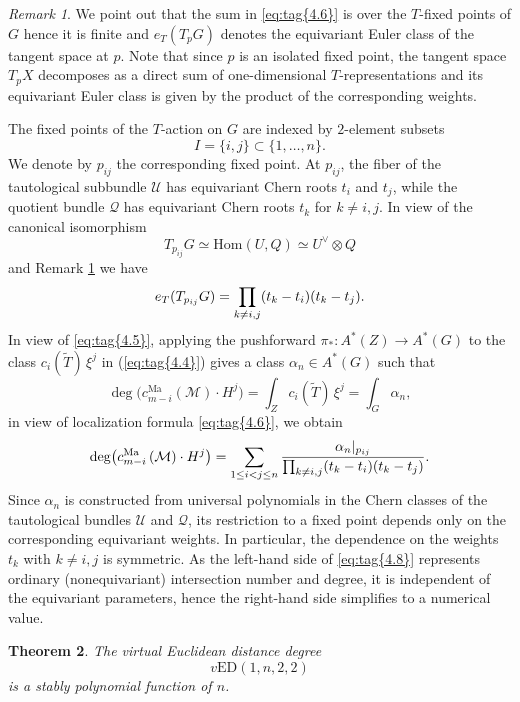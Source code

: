 \documentclass[11pt]{article}
\numberwithin{equation}{section}
\numberwithin{figure}{section}
\theoremstyle{plain}
\newtheorem{thm}{Theorem}[section]
\theoremstyle{definition}
\theoremstyle{remark}
\newtheorem{rem}[thm]{Remark}
\newcommand{\Hom}{\mathrm{Hom}}
\newcommand{\vED}{v\mathrm{ED}}
\begin{document}
\begin{rem}\label{rem:identificationEulerClassTangent}
    We point out that the sum in \ref{eq:tag{4.6}} is over the $T$-fixed points of $G$ hence it is finite and $e_T(T_pG)$ denotes the equivariant Euler class of the tangent space at $p$. Note that since $p$ is an isolated fixed point, the tangent space $T_p X$ decomposes as a direct sum of one-dimensional $T$-representations and its equivariant Euler class is given by the product of the corresponding weights.
\end{rem}
The fixed points of the $T$-action on $G$ are indexed by
$2$-element subsets $$I=\{i,j\}\subset\{1,\dots,n\}.$$
We denote by $p_{ij}$ the corresponding fixed point.
At $p_{ij}$, the fiber of the tautological subbundle $\mathcal U$ has
equivariant Chern roots $t_i$ and $t_j$, while the quotient bundle
$\mathcal Q$ has equivariant Chern roots $t_k$ for $k\neq i,j$. In view of the canonical isomorphism
\[
T_{p_{ij}}G \simeq \Hom(U,Q) \simeq U^\vee \otimes Q
\]
and Remark \ref{rem:identificationEulerClassTangent} we have
\begin{equation}\label{eq:tag{4.7}}
e_T(T_{p_{ij}}G) = \prod_{k\neq i,j}(t_k-t_i)(t_k-t_j).
\end{equation}
In view of \eqref{eq:tag{4.5}}, applying the pushforward
$\pi_\ast : A^\ast(Z) \to A^\ast(G)$ to the class
$c_i\left(\widetilde T\right)\,\xi^j$ in (\ref{eq:tag{4.4}}) gives a class
$\alpha_n \in A^\ast(G)$ such that
\[
\deg \bigl(
c^{\mathrm{Ma}}_{m-i}\left(\mathcal M\right)\cdot H^j
\bigr)
=
\int_Z c_i\left(\widetilde T\right)\,\xi^j
=
\int_G \alpha_n ,
\]
in view of localization formula \eqref{eq:tag{4.6}}, we obtain
\begin{equation}\label{eq:tag{4.8}}
\deg \bigl(
c^{\mathrm{Ma}}_{m-i}\left(\mathcal M\right)\cdot H^j
\bigr)=
\sum_{1\le i<j\le n}
\frac{\alpha_n|_{p_{ij}}}{
\prod_{k\neq i,j}(t_k-t_i)(t_k-t_j)
}.
\end{equation}
Since $\alpha_n$ is constructed from universal polynomials in the Chern
classes of the tautological bundles $\mathcal U$ and $\mathcal Q$, its
restriction to a fixed point depends only on the corresponding equivariant
weights.
In particular, the dependence on the weights $t_k$ with $k\neq i,j$ is
symmetric.
As the left-hand side of \eqref{eq:tag{4.8}} represents  ordinary
(nonequivariant) intersection number and degree, it is independent of the equivariant
parameters, hence the right-hand side simplifies to a numerical value.

\begin{thm}\label{prop:polynomiality-n}
The virtual Euclidean distance degree
\[
\vED(1,n,2,2)
\]
is a stably polynomial function of $n$.
\end{thm}
\end{document}
